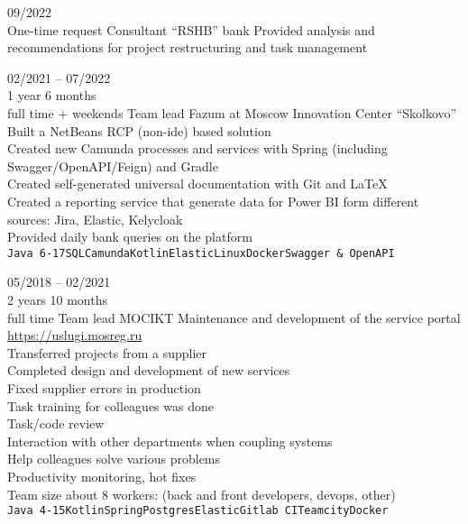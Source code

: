 


\begin{entrylist}
    \entry
    {09/2022\\\footnotesize{One-time request}}
    {Consultant}
    {\enquote{RSHB} bank}
    {
        Provided analysis and recommendations for project restructuring and task management
    }

    \entry
    {02/2021 -- 07/2022\\\footnotesize{1 year 6 months\\full time + weekends}}
    {Team lead}
    {Fazum at Moscow Innovation Center \enquote{Skolkovo}}
    {
        Built a NetBeans RCP (non-ide) based solution \\
    Created new Camunda processes and services with Spring (including Swagger/OpenAPI/Feign) and Gradle \\
    Created self-generated universal documentation with Git and LaTeX \\
    Created a reporting service that generate data for Power BI form different sources: Jira, Elastic, Kelycloak \\
    Provided daily bank queries on the platform \\
    \texttt{Java 6-17}\slashsep\texttt{SQL}\slashsep\texttt{Camunda}\slashsep\texttt{Kotlin}\slashsep\texttt{Elastic}\slashsep\texttt{Linux}\slashsep\texttt{Docker}\slashsep\texttt{Swagger \& OpenAPI}
    }

    \entry
    {05/2018 -- 02/2021\\\footnotesize{2 years 10 months\\full time}}
    {Team lead}
    {MOCIKT}
    {
        Maintenance and development of the service portal \url{https://uslugi.mosreg.ru} \\
        Transferred projects from a supplier \\
        Completed design and development of new services \\
        Fixed supplier errors in production \\
        Task training for colleagues was done \\
        Task/code review \\
        Interaction with other departments when coupling systems \\
        Help colleagues solve various problems \\
        Productivity monitoring, hot fixes \\
    Team size about 8 workers: (back and front developers, devops, other) \\
    \texttt{Java 4-15}\slashsep\texttt{Kotlin}\slashsep\texttt{Spring}\slashsep\texttt{Postgres}\slashsep\texttt{Elastic}\slashsep\texttt{Gitlab CI}\slashsep\texttt{Teamcity}\slashsep\texttt{Docker}
	}


\end{entrylist}
